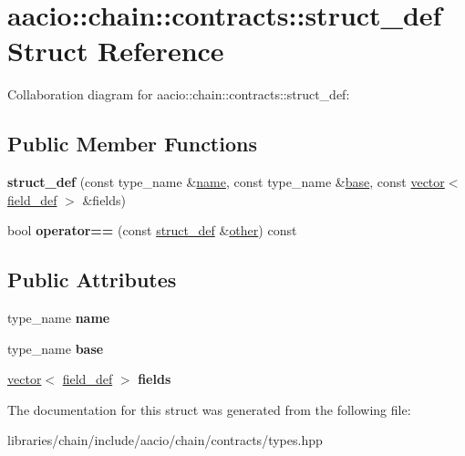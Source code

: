 \hypertarget{structaacio_1_1chain_1_1contracts_1_1struct__def}{}\section{aacio\+:\+:chain\+:\+:contracts\+:\+:struct\+\_\+def Struct Reference}
\label{structaacio_1_1chain_1_1contracts_1_1struct__def}


Collaboration diagram for aacio\+:\+:chain\+:\+:contracts\+:\+:struct\+\_\+def\+:
\subsection*{Public Member Functions}
\begin{DoxyCompactItemize}
\item 
\mbox{\label{structaacio_1_1chain_1_1contracts_1_1struct__def_a66f6220988cb0a6e2956d648212d19b4}} 
{\bfseries struct\+\_\+def} (const type\+\_\+name \&\mbox{\hyperlink{structaacio_1_1chain_1_1name}{name}}, const type\+\_\+name \&\mbox{\hyperlink{structbase}{base}}, const \mbox{\hyperlink{classstd_1_1vector}{vector}}$<$ \mbox{\hyperlink{structaacio_1_1chain_1_1contracts_1_1field__def}{field\+\_\+def}} $>$ \&fields)
\item 
\mbox{\label{structaacio_1_1chain_1_1contracts_1_1struct__def_a7e2cb437fde2c9fcadaf10e27b4b0f94}} 
bool {\bfseries operator==} (const \mbox{\hyperlink{structaacio_1_1chain_1_1contracts_1_1struct__def}{struct\+\_\+def}} \&\mbox{\hyperlink{structother}{other}}) const
\end{DoxyCompactItemize}
\subsection*{Public Attributes}
\begin{DoxyCompactItemize}
\item 
\mbox{\label{structaacio_1_1chain_1_1contracts_1_1struct__def_a8fd65b7ea1b70544f3c3690f6cc43840}} 
type\+\_\+name {\bfseries name}
\item 
\mbox{\label{structaacio_1_1chain_1_1contracts_1_1struct__def_acc3da2f9aebf124f1f6d21314bd68715}} 
type\+\_\+name {\bfseries base}
\item 
\mbox{\label{structaacio_1_1chain_1_1contracts_1_1struct__def_ab55b2f784ceebadf3e6ba23f0d5f5b35}} 
\mbox{\hyperlink{classstd_1_1vector}{vector}}$<$ \mbox{\hyperlink{structaacio_1_1chain_1_1contracts_1_1field__def}{field\+\_\+def}} $>$ {\bfseries fields}
\end{DoxyCompactItemize}


The documentation for this struct was generated from the following file\+:\begin{DoxyCompactItemize}
\item 
libraries/chain/include/aacio/chain/contracts/types.\+hpp\end{DoxyCompactItemize}
